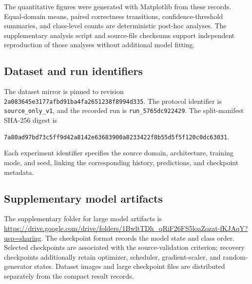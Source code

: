 \documentclass[10pt,a4paper]{article}
\begin{document}
The quantitative figures were generated with Matplotlib from these records. Equal-domain means, paired correctness transitions, confidence-threshold summaries, and class-level counts are deterministic post-hoc analyses. The supplementary analysis script and source-file checksums support independent reproduction of those analyses without additional model fitting.

\subsection{Dataset and run identifiers}
The dataset mirror is pinned to revision \texttt{2a083645e3177afbd91ba4fa2651238f8994d335}. The protocol identifier is \texttt{source\_only\_v1}, and the recorded run is \texttt{run\_5765dc922429}. The split-manifest SHA-256 digest is
\begin{center}
\small\texttt{7a80ad97bd73c5ff9d42a8142e63683900a8233422f8b55d5f5f120c0dc63031}.
\end{center}
Each experiment identifier specifies the source domain, architecture, training mode, and seed, linking the corresponding history, predictions, and checkpoint metadata.

\subsection{Supplementary model artifacts}
The supplementary folder for large model artifacts is
\url{https://drive.google.com/drive/folders/1BwltTDh_qRiF26FS5loaZozat-fKJAqY?usp=sharing}.
The checkpoint format records the model state and class order. Selected checkpoints are associated with the source-validation criterion; recovery checkpoints additionally retain optimizer, scheduler, gradient-scaler, and random-generator states. Dataset images and large checkpoint files are distributed separately from the compact result records.
\end{document}
